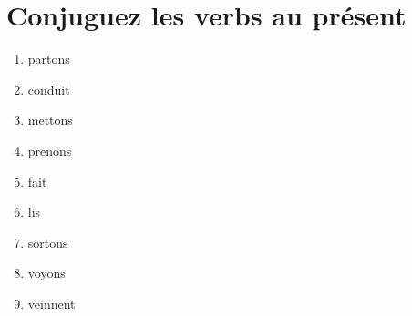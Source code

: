 \section{Conjuguez les verbs au présent}

\begin{enumerate}
    \item partons
    \item conduit
    \item mettons
    \item prenons
    \item fait
    \item lis
    \item sortons
    \item voyons
    \item veinnent
\end{enumerate}